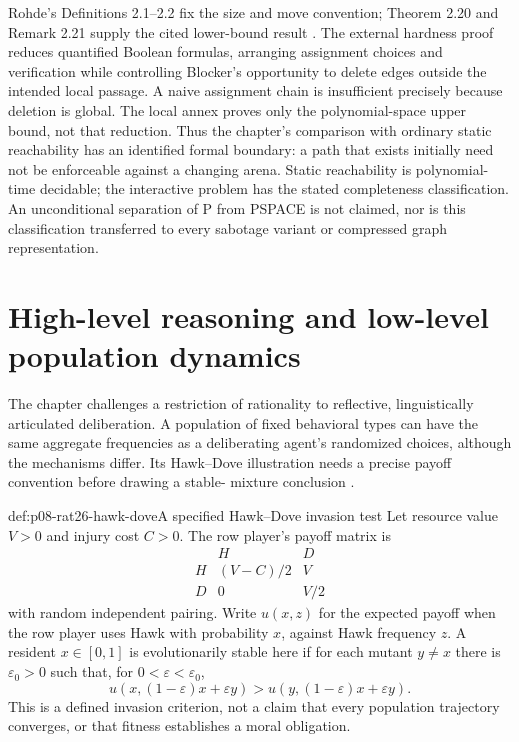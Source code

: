 Rohde's Definitions 2.1--2.2 fix the size and move convention; Theorem
2.20 and Remark 2.21 supply the cited lower-bound result
\cite[pp.~24--26, 43--44]{Rohde2006DynamicStructures}. The external
hardness proof reduces quantified Boolean formulas, arranging assignment
choices and verification while controlling Blocker's opportunity to
delete edges outside the intended local passage. A naive assignment
chain is insufficient precisely because deletion is global. The local
annex proves only the polynomial-space upper bound, not that reduction.
Thus the chapter's comparison with ordinary static reachability has an
identified formal boundary: a path that exists initially need not be
enforceable against a changing arena. Static reachability is polynomial-
time decidable; the interactive problem has the stated completeness
classification. An unconditional separation of P from PSPACE is not
claimed, nor is this classification transferred to every sabotage
variant or compressed graph representation.

\section{High-level reasoning and low-level population dynamics}

The chapter challenges a restriction of rationality to reflective,
linguistically articulated deliberation. A population of fixed behavioral
types can have the same aggregate frequencies as a deliberating agent's
randomized choices, although the mechanisms differ. Its Hawk--Dove
illustration needs a precise payoff convention before drawing a stable-
mixture conclusion \cite[p.~191]{VanBenthemLiuSmets2021Logico}.

\begin{hbdefinition}{def:p08-rat26-hawk-dove}{A specified Hawk--Dove invasion test}
Let resource value \(V>0\) and injury cost \(C>0\). The row
player's payoff matrix is
\[
\begin{array}{c|cc}
 &H&D\\\hline
H&(V-C)/2&V\\
D&0&V/2
\end{array}
\]
with random independent pairing. Write \(u(x,z)\) for the expected
payoff when the row player uses Hawk with probability \(x\), against
Hawk frequency \(z\). A resident \(x\in[0,1]\) is evolutionarily
stable here if for each mutant \(y\ne x\) there is \(\varepsilon_0>0\)
such that, for \(0<\varepsilon<\varepsilon_0\),
\[
 u(x,(1-\varepsilon)x+\varepsilon y)
 >u(y,(1-\varepsilon)x+\varepsilon y).
\]
This is a defined invasion criterion, not a claim that every population
trajectory converges, or that fitness establishes a moral obligation.
\end{hbdefinition}


